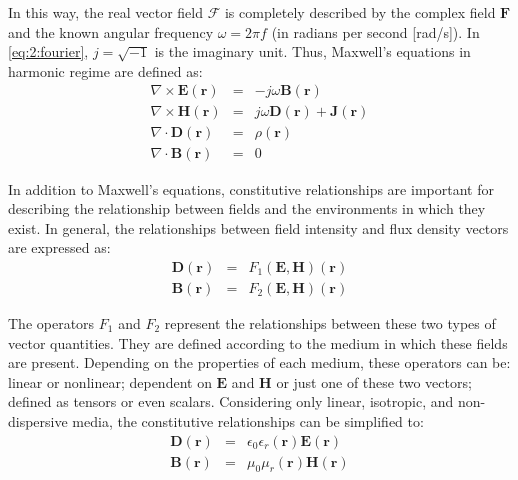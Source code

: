 		In this way, the real vector field $\boldsymbol{\mathcal {F}}$ is completely described by the complex field $\mathbf{F}$ and the known angular frequency $\omega = 2\pi f$ (in radians per second [rad/s]). In \eqref{eq:2:fourier}, $j=\sqrt{-1}$ is the imaginary unit. Thus, Maxwell's equations in harmonic regime are defined as:
		\begin{eqnarray}
			\nabla\times\mathbf{E}(\mathbf{r}) &=& - j\omega\mathbf{B}(\mathbf{r}) \label{eq:2:maxwell:har:1} \\
			\nabla\times\mathbf{H}(\mathbf{r}) &=&  j\omega\mathbf{D}(\mathbf{r}) + \mathbf{J}(\mathbf{r}) \label{eq:2:maxwell:har:2} \\
			\nabla\cdot\mathbf{D}(\mathbf{r}) &=& \rho(\mathbf{r}) \label{eq:2:maxwell:har:3} \\
			\nabla\cdot\mathbf{B}(\mathbf{r}) &=& 0 \label{eq:2:maxwell:har:4}
		\end{eqnarray}
	
		In addition to Maxwell's equations, constitutive relationships are important for describing the relationship between fields and the environments in which they exist. In general, the relationships between field intensity and flux density vectors are expressed as:
		\begin{eqnarray}
			\mathbf{D}(\mathbf{r}) &=& F_1(\mathbf{E}, \mathbf{H})(\mathbf{r}) \label{eq:2:constitutive:general:1} \\
			\mathbf{B}(\mathbf{r}) &=& F_2(\mathbf{E}, \mathbf{H})(\mathbf{r}) \label{eq:2:constitutive:general:2}
		\end{eqnarray}
	
		The operators $F_1$ and $F_2$ represent the relationships between these two types of vector quantities. They are defined according to the medium in which these fields are present. Depending on the properties of each medium, these operators can be: linear or nonlinear; dependent on $\mathbf{E}$ and $\mathbf{H}$ or just one of these two vectors; defined as tensors or even scalars. Considering only linear, isotropic, and non-dispersive media, the constitutive relationships can be simplified to:
		\begin{eqnarray}
			\mathbf{D}(\mathbf{r}) &=& \epsilon_0\epsilon_r(\mathbf{r})\mathbf{E}(\mathbf{r}) \label{eq:2:constitutive:liniso:1} \\
			\mathbf{B}(\mathbf{r}) &=& \mu_0\mu_r(\mathbf{r})\mathbf{H}(\mathbf{r}) \label{eq:2:constitutive:liniso:2}
		\end{eqnarray}
	

